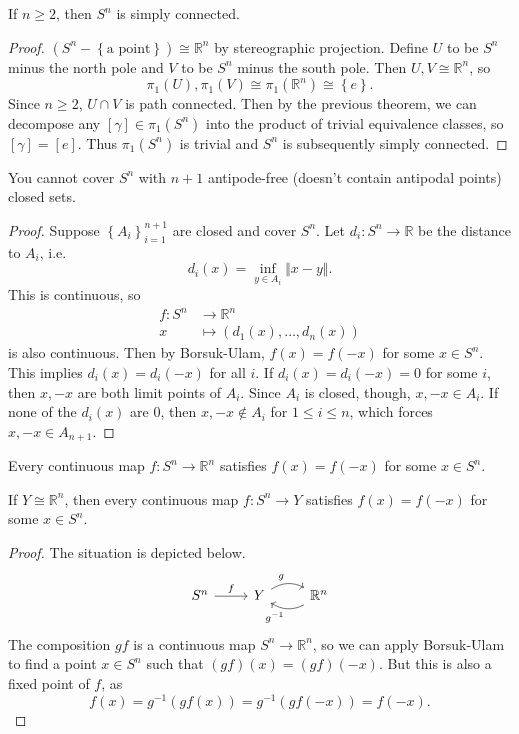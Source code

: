 \documentclass[twoside,10pt]{report}
\begin{document}
\begin{cor}
If $n \geq 2$, then $S^{n}$ is simply connected.
\end{cor}
\begin{proof}
	$(S^{n}-\left\{ \text{a point} \right\}) \cong \mathbb{R}^{n}$ by stereographic projection. Define $U$ to be $S^{n}$ minus the north pole and $V$ to be $S^{n}$ minus the south pole. Then $U,V \cong \mathbb{R}^{n}$, so
	\[
		\pi_1(U), \pi_1(V) \cong \pi_1(\mathbb{R}^{n}) \cong \left\{ e \right\}.
	\] Since $n \geq 2$, $U \cap V$ is path connected. Then by the previous theorem, we can decompose any $[\gamma] \in \pi_1(S^{n})$ into the product of trivial equivalence classes, so $[\gamma]=[e]$. Thus $\pi_1(S^{n})$ is trivial and $S^{n}$ is subsequently simply connected.
\end{proof}

\begin{cor}
	You cannot cover $S^{n}$ with $n+1$ antipode-free (doesn't contain antipodal points) closed sets.
\end{cor}
\begin{proof}
	Suppose $\left\{ A_i \right\}_{i=1}^{n+1}$ are closed and cover $S^{n}$. Let $d_i:S^{n}\to \mathbb{R}$ be the distance to $A_{i}$, i.e.
	\[
		d_i(x) = \inf_{y \in A_{i}}{\Vert{x-y}\Vert}.
	\] This is continuous, so
	\begin{align*}
		f:S^{n}&\to \mathbb{R}^{n}\\
		x&\mapsto (d_1(x), \dots, d_{n}(x))
	\end{align*}
	is also continuous. Then by Borsuk-Ulam, $f(x)=f(-x)$ for some $x \in S^{n}$. This implies $d_{i}(x)=d_{i}(-x)$ for all $i$. If $d_i(x)=d_i(-x)=0$ for some $i$, then $x,-x$ are both limit points of $A_i$. Since $A_i$ is closed, though, $x,-x \in A_i$. If none of the $d_i(x)$ are 0, then $x,-x \not\in A_i$ for $1 \leq i \leq n$, which forces $x,-x \in A_{n+1}$.
\end{proof}

\begin{thrm}
	Every continuous map $f:S^{n}\to \mathbb{R}^{n}$ satisfies $f(x)=f(-x)$ for some $x \in S^{n}$.
\end{thrm}

\begin{cor}
	If $Y \cong \mathbb{R}^{n}$, then every continuous map $f:S^{n}\to Y$ satisfies $f(x)=f(-x)$ for some $x \in S^{n}$.
\end{cor}
\begin{proof}
	The situation is depicted below.
	\[
	\begin{tikzcd}
		S^{n}\rar{f}&Y\rar[bend left]{g}&\mathbb{R}^{n}\lar[bend left]{g^{-1}}
	\end{tikzcd}
\] The composition $gf$ is a continuous map $S^{n}\to \mathbb{R}^{n}$, so we can apply Borsuk-Ulam to find a point $x \in S^{n}$ such that $(gf)(x)=(gf)(-x)$. But this is also a fixed point of $f$, as
\[
	f(x) = g^{-1}(gf(x)) = g^{-1}(gf(-x)) = f(-x).
\] 
\end{proof}
\end{document}
